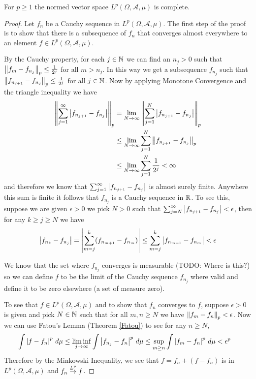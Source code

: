 \begin{lem}\label{CompletenessOfLp}For $p \geq 1$ the normed vector
  space $L^p(\Omega,  \mathcal{A}, \mu)$ is complete.
\end{lem}
\begin{proof}
Let $f_n$ be a Cauchy sequence in $L^p(\Omega,  \mathcal{A}, \mu)$.
The first step of the proof is to show that there is a subsequence of
$f_n$ that converges almost everywhere to an element $f \in
L^p(\Omega,  \mathcal{A}, \mu)$.

By the Cauchy property, for each $j \in \mathbb{N}$ we can find an $n_j > 0$ such that
$\left \lVert f_m - f_{n_j} \right \rVert_p \leq \frac{1}{2^j}$ for all $m > n_j$.  In
this way we get a subsequence $f_{n_j}$ such that $\left \lVert f_{n_{j+1}} -
    f_{n_j} \right \rVert_p \leq \frac{1}{2^j}$ for all $j \in \mathbb{N}$.  Now by
  applying Monotone Convergence and the triangle inequality we have
\begin{align*}
\left \lVert \sum_{j=1}^\infty \left \vert f_{n_{j+1}} - f_{n_j} \right \vert  \right \rVert_p &= \lim_{N \to
  \infty} \left \lVert \sum_{j=1}^N \left \vert f_{n_{j+1}} - f_{n_j} \right \vert  \right \rVert_p \\
&\leq \lim_{N \to
  \infty} \sum_{j=1}^N \left \lVert f_{n_{j+1}} - f_{n_j} \right \rVert_p \\
&\leq \lim_{N \to
  \infty} \sum_{j=1}^N \frac{1}{2^j} < \infty
\end{align*}
and therefore we know that $\sum_{j=1}^\infty \left \vert f_{n_{j+1}} -
  f_{n_j} \right \vert$ is almost surely finite.  Anywhere this sum is finite it
follows that $f_{n_j}$ is a Cauchy sequence in $\mathbb{R}$.  To see this,
suppose we are given
$\epsilon > 0$ we pick $N > 0$ such that $\sum_{j=N}^\infty \left \vert f_{n_{j+1}} -
  f_{n_j} \right \vert < \epsilon$, then for any $k \geq j \geq N$ we have 
\begin{align*}\left \vert f_{n_k} -
  f_{n_j} \right \vert = \left \vert \sum_{m=j}^k (f_{n_{m+1}} -  f_{n_m}) \right \vert \leq
\sum_{m=j}^k \left \vert  f_{n_{m+1}} -  f_{n_m} \right \vert < \epsilon
\end{align*}

We know that the set where $f_{n_j}$ converges is measurable (TODO:
Where is this?) so we can
define $f$ to be the limit of the Cauchy sequence $f_{n_j}$ where
valid and define it to be zero elsewhere (a set of measure zero).

To see that $f \in L^p(\Omega,  \mathcal{A}, \mu)$ and to show that
$f_n$ converges to $f$, suppose $\epsilon > 0$ is given and pick $N
\in \mathbb{N}$ such that for all $m,n \geq N$ we have
$\left \lVert f_m-f_n \right \rVert_p < \epsilon$.  Now we can use Fatou's
Lemma (Theorem \ref{Fatou})  to see for any $n \geq N$, 
\begin{align*}
\int \left \vert f-f_n \right \vert^p \, d\mu &\leq \liminf_{j \to \infty} \int
\left \vert f_{n_j} - f_n \right \vert^p \, d\mu \leq \sup_{m\geq n} \int
\left \vert f_{m} - f_n \right \vert^p \, d\mu < \epsilon^p
\end{align*}
Therefore by the Minkowski Inequality, we see that $f = f_n + (f -
f_n)$ is in  $L^p(\Omega,  \mathcal{A}, \mu)$ and $f_n \overset{L^p}\to f$.
\end{proof}

